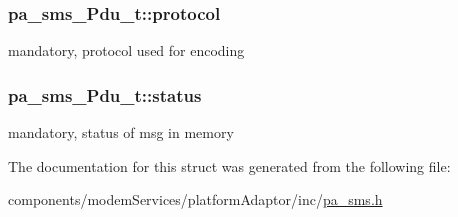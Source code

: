 \subsubsection[{\texorpdfstring{protocol}{protocol}}]{ pa\+\_\+sms\+\_\+\+Pdu\+\_\+t\+::protocol}\hypertarget{structpa__sms___pdu__t_a9080617b3596b033601136c81bdbc6c0}{}\label{structpa__sms___pdu__t_a9080617b3596b033601136c81bdbc6c0}


mandatory, protocol used for encoding 

\subsubsection[{\texorpdfstring{status}{status}}]{ pa\+\_\+sms\+\_\+\+Pdu\+\_\+t\+::status}\hypertarget{structpa__sms___pdu__t_ac972d79efde081b3d0a2b3218898b765}{}\label{structpa__sms___pdu__t_ac972d79efde081b3d0a2b3218898b765}


mandatory, status of msg in memory 



The documentation for this struct was generated from the following file\+:\begin{DoxyCompactItemize}
\item 
components/modem\+Services/platform\+Adaptor/inc/\hyperlink{pa__sms_8h}{pa\+\_\+sms.\+h}\end{DoxyCompactItemize}
